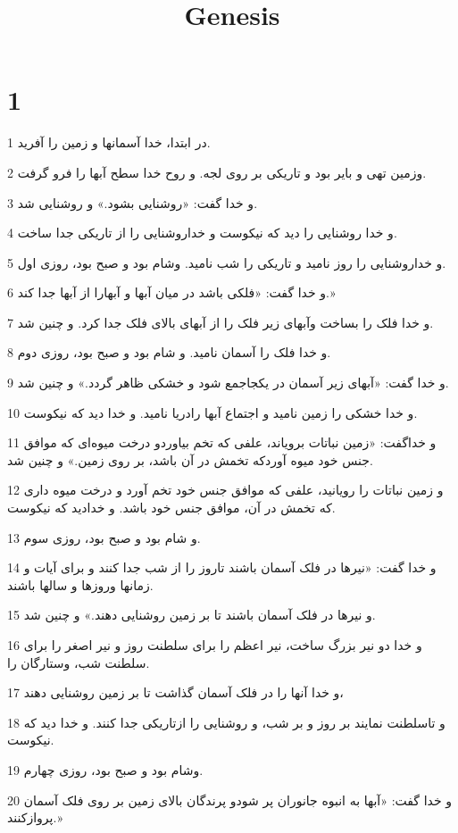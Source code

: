 

\title{Genesis}

 
\chapter{1}

\par 1 در ابتدا، خدا آسمانها و زمین را آفرید.
\par 2 وزمین تهی و بایر بود و تاریکی بر روی لجه. و روح خدا سطح آبها را فرو گرفت.
\par 3 و خدا گفت: «روشنایی بشود.» و روشنایی شد.
\par 4 و خدا روشنایی را دید که نیکوست و خداروشنایی را از تاریکی جدا ساخت.
\par 5 و خداروشنایی را روز نامید و تاریکی را شب نامید. وشام بود و صبح بود، روزی اول.
\par 6 و خدا گفت: «فلکی باشد در میان آبها و آبهارا از آبها جدا کند.»
\par 7 و خدا فلک را بساخت وآبهای زیر فلک را از آبهای بالای فلک جدا کرد. و چنین شد.
\par 8 و خدا فلک را آسمان نامید. و شام بود و صبح بود، روزی دوم.
\par 9 و خدا گفت: «آبهای زیر آسمان در یکجاجمع شود و خشکی ظاهر گردد.» و چنین شد.
\par 10 و خدا خشکی را زمین نامید و اجتماع آبها رادریا نامید. و خدا دید که نیکوست.
\par 11 و خداگفت: «زمین نباتات برویاند، علفی که تخم بیاوردو درخت میوه‌ای که موافق جنس خود میوه آوردکه تخمش در آن باشد، بر روی زمین.» و چنین شد.
\par 12 و زمین نباتات را رویانید، علفی که موافق جنس خود تخم آورد و درخت میوه داری که تخمش در آن، موافق جنس خود باشد. و خدادید که نیکوست.
\par 13 و شام بود و صبح بود، روزی سوم.
\par 14 و خدا گفت: «نیرها در فلک آسمان باشند تاروز را از شب جدا کنند و برای آیات و زمانها وروزها و سالها باشند.
\par 15 و نیرها در فلک آسمان باشند تا بر زمین روشنایی دهند.» و چنین شد.
\par 16 و خدا دو نیر بزرگ ساخت، نیر اعظم را برای سلطنت روز و نیر اصغر را برای سلطنت شب، وستارگان را.
\par 17 و خدا آنها را در فلک آسمان گذاشت تا بر زمین روشنایی دهند،
\par 18 و تاسلطنت نمایند بر روز و بر شب، و روشنایی را ازتاریکی جدا کنند. و خدا دید که نیکوست.
\par 19 وشام بود و صبح بود، روزی چهارم.
\par 20 و خدا گفت: «آبها به انبوه جانوران پر شودو پرندگان بالای زمین بر روی فلک آسمان پروازکنند.»
